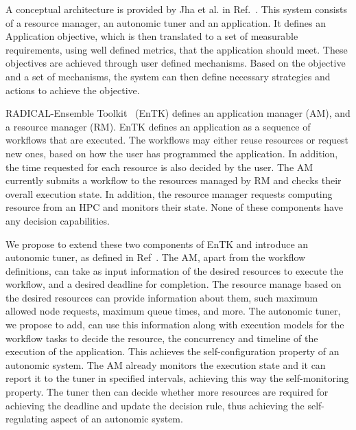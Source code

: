 A conceptual architecture is provided by Jha et al. in Ref.~\cite{jha2009self}. 
This system consists of a resource manager, an autonomic tuner and an application. 
It defines an Application objective, which is then translated to a set of 
measurable requirements, using well defined metrics, that the application 
should meet. These objectives are achieved through user defined mechanisms. 
Based on the objective and a set of mechanisms, the system can then define 
necessary strategies and actions to achieve the objective.

RADICAL-Ensemble Toolkit~\cite{balasubramanian2018harnessing} (EnTK) defines an application
manager (AM), and a resource manager (RM). EnTK defines an application as a sequence of 
workflows that are executed. The workflows may either reuse resources or request new ones, 
based on how the user has programmed the application. In addition, the time requested for 
each resource is also decided by the user. The AM currently submits a workflow to 
the resources managed by RM and checks their overall execution state. In addition, the 
resource manager requests computing resource from an HPC and monitors their state. None of
these components have any decision capabilities.

We propose to extend these two components of EnTK and introduce an autonomic tuner, as 
defined in Ref~\cite{jha2009self}. The AM, apart from the workflow definitions, can take 
as input information of the desired resources to execute the workflow, and a desired deadline 
for completion. The resource manage based on the desired resources can provide information 
about them, such maximum allowed node requests, maximum queue times, and more. The autonomic 
tuner, we propose to add, can use this information along with execution models for the 
workflow tasks to decide the resource, the concurrency and timeline of the execution of 
the application. This achieves the self-configuration property of an autonomic system. 
The AM already monitors the execution state and it can report it to the tuner in specified 
intervals, achieving this way the self-monitoring property. The tuner then can decide 
whether more resources are required for achieving the deadline and update the decision 
rule, thus achieving the self-regulating aspect of an autonomic system.


